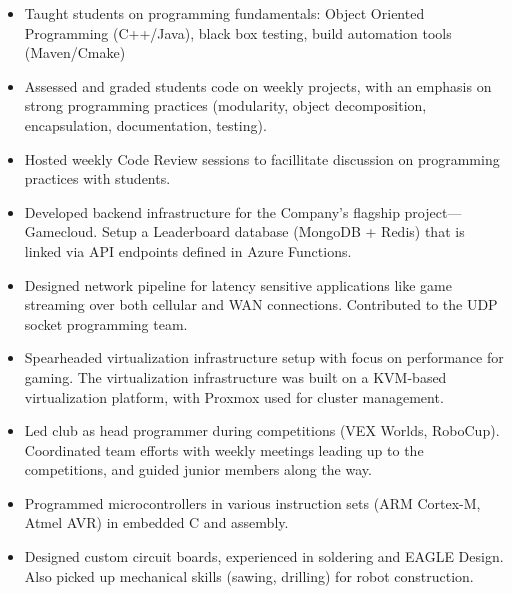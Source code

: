 \documentclass[10pt,a4paper,ragged2e,withhyper]{altacv}
\begin{document}
\begin{paracol}{2}

\begin{itemize}
  \item Taught students on programming fundamentals: Object Oriented Programming (C++/Java), black box testing, build automation tools (Maven/Cmake)
  \item Assessed and graded students code on weekly projects, with an emphasis on strong programming practices (modularity, object decomposition, encapsulation, documentation, testing).
  \item Hosted weekly Code Review sessions to facillitate discussion on programming practices with students.
\end{itemize}

\divider

\begin{itemize}
\item Developed backend infrastructure for the Company’s flagship project—Gamecloud. Setup a Leaderboard database (MongoDB + Redis) that is linked via API endpoints defined in Azure Functions.
\item Designed network pipeline for latency sensitive applications like game streaming over both cellular and WAN connections. Contributed to the UDP socket programming team. 
\item Spearheaded virtualization infrastructure setup with focus on performance for gaming. The virtualization infrastructure was built on a KVM-based virtualization platform, with Proxmox used for cluster management.

\end{itemize}



\begin{itemize}
  \item Led club as head programmer during competitions (VEX Worlds, RoboCup). Coordinated team efforts with weekly meetings leading up to the competitions, and guided junior members along the way.
  \item Programmed microcontrollers in various instruction sets (ARM Cortex-M, Atmel AVR) in embedded C and assembly. 
  \item Designed custom circuit boards, experienced in soldering and EAGLE Design. Also picked up mechanical skills (sawing, drilling) for robot construction.
\end{itemize}


\end{paracol}
\end{document}
